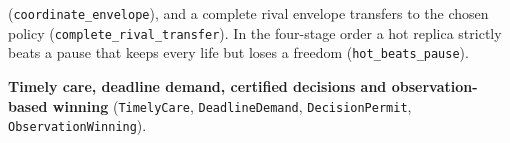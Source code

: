 \documentclass[
]{article}
\begin{document}
(\texttt{c\allowbreak{}o\allowbreak{}o\allowbreak{}r\allowbreak{}d\allowbreak{}i\allowbreak{}n\allowbreak{}a\allowbreak{}t\allowbreak{}e\allowbreak{}\_\allowbreak{}e\allowbreak{}n\allowbreak{}v\allowbreak{}e\allowbreak{}l\allowbreak{}o\allowbreak{}p\allowbreak{}e}),
and a complete rival envelope transfers to the chosen policy
(\texttt{c\allowbreak{}o\allowbreak{}m\allowbreak{}p\allowbreak{}l\allowbreak{}e\allowbreak{}t\allowbreak{}e\allowbreak{}\_\allowbreak{}r\allowbreak{}i\allowbreak{}v\allowbreak{}a\allowbreak{}l\allowbreak{}\_\allowbreak{}t\allowbreak{}r\allowbreak{}a\allowbreak{}n\allowbreak{}s\allowbreak{}f\allowbreak{}e\allowbreak{}r}).
In the four-stage order a hot replica strictly beats a pause that keeps
every life but loses a freedom (\texttt{hot\_beats\_pause}).

\textbf{Timely care, deadline demand, certified decisions and
observation-based winning} (\texttt{TimelyCare},
\texttt{DeadlineDemand}, \texttt{DecisionPermit},
\texttt{O\allowbreak{}b\allowbreak{}s\allowbreak{}e\allowbreak{}r\allowbreak{}v\allowbreak{}a\allowbreak{}t\allowbreak{}i\allowbreak{}o\allowbreak{}n\allowbreak{}W\allowbreak{}i\allowbreak{}n\allowbreak{}n\allowbreak{}i\allowbreak{}n\allowbreak{}g}).
\end{document}
